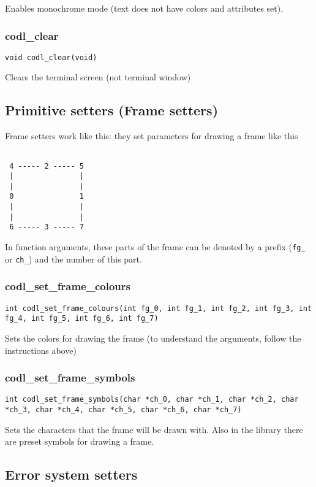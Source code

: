 \documentclass{article}
\newcommand{\fstep}{\vspace{3mm}\noindent}
\begin{document}
\fstep{} Enables monochrome mode (text does not have colors and attributes set).

\subsubsection{codl\_clear}
{\tt void codl\_clear(void)}

\fstep{} Clears the terminal screen (not terminal window)

\subsection{Primitive setters (Frame setters)}
Frame setters work like this: they set parameters for drawing a frame like this

\begin{verbatim}

 4 ----- 2 ----- 5
 |               |
 |               |
 0               1
 |               |
 |               |
 6 ----- 3 ----- 7

\end{verbatim}

In function arguments, these parts of the frame can be denoted by a prefix
({\tt fg\_} or {\tt ch\_}) and the number of this part. 

\subsubsection{codl\_set\_frame\_colours}
{\tt int codl\_set\_frame\_colours(int fg\_0, int fg\_1, int fg\_2, int fg\_3,
                int fg\_4, int fg\_5, int fg\_6, int fg\_7)}
              
\fstep{} Sets the colors for drawing the frame (to understand the
arguments, follow the instructions above)

\subsubsection{codl\_set\_frame\_symbols}
{\tt int  codl\_set\_frame\_symbols(char *ch\_0, char *ch\_1, char *ch\_2,
                char *ch\_3, char *ch\_4, char *ch\_5, char *ch\_6, char *ch\_7)}

\fstep{} Sets the characters that the frame will be drawn with.
Also in the library there are preset symbols for drawing a frame.

\subsection{Error system setters}
\end{document}
